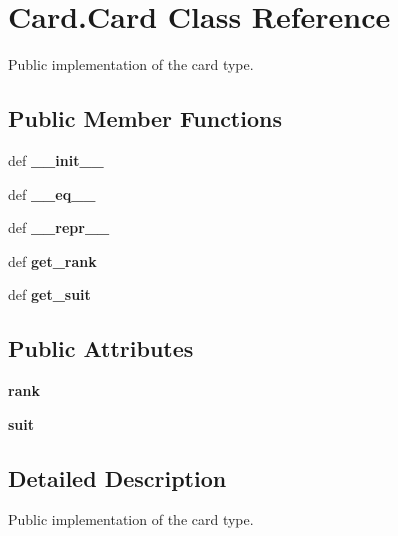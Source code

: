 \hypertarget{classCard_1_1Card}{\section{Card.\-Card Class Reference}
\label{classCard_1_1Card}
}


Public implementation of the card type.  


\subsection*{Public Member Functions}
\begin{DoxyCompactItemize}
\item 
\hypertarget{classCard_1_1Card_ad1000ce602ada0ec575a2c883d3a3f6a}{def {\bfseries \-\_\-\-\_\-init\-\_\-\-\_\-}}\label{classCard_1_1Card_ad1000ce602ada0ec575a2c883d3a3f6a}

\item 
\hypertarget{classCard_1_1Card_a63a4e13f8d320a6fff89e2bc96cbbefc}{def {\bfseries \-\_\-\-\_\-eq\-\_\-\-\_\-}}\label{classCard_1_1Card_a63a4e13f8d320a6fff89e2bc96cbbefc}

\item 
\hypertarget{classCard_1_1Card_aea3897ee0ea7aa0a12fade5b6c934c6b}{def {\bfseries \-\_\-\-\_\-repr\-\_\-\-\_\-}}\label{classCard_1_1Card_aea3897ee0ea7aa0a12fade5b6c934c6b}

\item 
\hypertarget{classCard_1_1Card_a421cdbd114ddd9a67f5b917be062df47}{def {\bfseries get\-\_\-rank}}\label{classCard_1_1Card_a421cdbd114ddd9a67f5b917be062df47}

\item 
\hypertarget{classCard_1_1Card_ac505868aaa256793ce55ea4ce15aad43}{def {\bfseries get\-\_\-suit}}\label{classCard_1_1Card_ac505868aaa256793ce55ea4ce15aad43}

\end{DoxyCompactItemize}
\subsection*{Public Attributes}
\begin{DoxyCompactItemize}
\item 
\hypertarget{classCard_1_1Card_ac4624606da21334caa1b79ae042f6a57}{{\bfseries rank}}\label{classCard_1_1Card_ac4624606da21334caa1b79ae042f6a57}

\item 
\hypertarget{classCard_1_1Card_afcfd2cff95326f80df87f541536c0a9d}{{\bfseries suit}}\label{classCard_1_1Card_afcfd2cff95326f80df87f541536c0a9d}

\end{DoxyCompactItemize}


\subsection{Detailed Description}
Public implementation of the card type. 